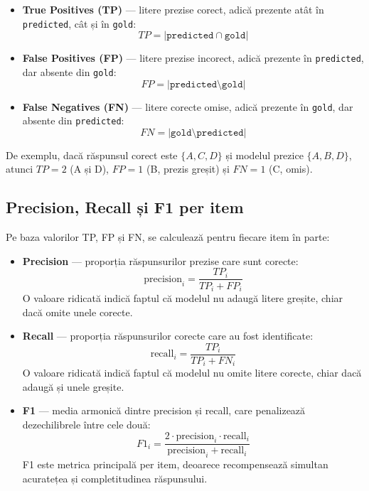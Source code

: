 \documentclass[12pt, a4paper, oneside, romanian]{teza-upb}
\begin{document}
\begin{itemize}
    \item \textbf{True Positives (TP)} --- litere prezise corect, adică prezente atât în \texttt{predicted}, cât și în \texttt{gold}:
    \[ TP = |\texttt{predicted} \cap \texttt{gold}| \]

    \item \textbf{False Positives (FP)} --- litere prezise incorect, adică prezente în \texttt{predicted}, dar absente din \texttt{gold}:
    \[ FP = |\texttt{predicted} \setminus \texttt{gold}| \]

    \item \textbf{False Negatives (FN)} --- litere corecte omise, adică prezente în \texttt{gold}, dar absente din \texttt{predicted}:
    \[ FN = |\texttt{gold} \setminus \texttt{predicted}| \]
\end{itemize}

De exemplu, dacă răspunsul corect este $\{A, C, D\}$ și modelul prezice $\{A, B, D\}$, atunci $TP = 2$ (A și D), $FP = 1$ (B, prezis greșit) și $FN = 1$ (C, omis).

\subsection{Precision, Recall și F1 per item}

Pe baza valorilor TP, FP și FN, se calculează pentru fiecare item în parte:

\begin{itemize}
    \item \textbf{Precision} --- proporția răspunsurilor prezise care sunt corecte:
    \[ \text{precision}_i = \frac{TP_i}{TP_i + FP_i} \]
    O valoare ridicată indică faptul că modelul nu adaugă litere greșite, chiar dacă omite unele corecte.

    \item \textbf{Recall} --- proporția răspunsurilor corecte care au fost identificate:
    \[ \text{recall}_i = \frac{TP_i}{TP_i + FN_i} \]
    O valoare ridicată indică faptul că modelul nu omite litere corecte, chiar dacă adaugă și unele greșite.

    \item \textbf{F1} --- media armonică dintre precision și recall, care penalizează dezechilibrele între cele două:
    \[ F1_i = \frac{2 \cdot \text{precision}_i \cdot \text{recall}_i}{\text{precision}_i + \text{recall}_i} \]
    F1 este metrica principală per item, deoarece recompensează simultan acuratețea și completitudinea răspunsului.
\end{itemize}
\end{document}
